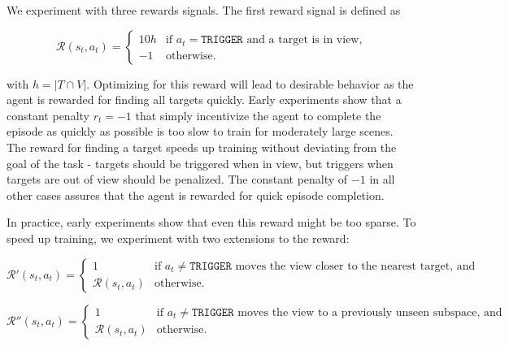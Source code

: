 
We experiment with three rewards signals.
The first reward signal is defined as

\begin{equation*}
    \mathcal{R}(s_t, a_t) =
    \begin{cases}
        10h & \text{if \(a_t = \mathtt{TRIGGER}\) and a target is in view,} \\
        -1  & \text{otherwise.}
    \end{cases}
\end{equation*}

with \(h = \left\lvert T \cap V \right\rvert\). 
Optimizing for this reward will lead to desirable behavior as the agent is rewarded for finding all targets quickly.
Early experiments show that a constant penalty \(r_t = -1\) that simply incentivize the agent to complete the episode as quickly as possible is too slow to train for moderately large scenes.
The reward for finding a target speeds up training without deviating from the goal of the task -
targets should be triggered when in view, but triggers when targets are out of view should be penalized.
The constant penalty of \(-1\) in all other cases assures that the agent is rewarded for quick episode completion.

In practice, early experiments show that even this reward might be too sparse.
To speed up training, we experiment with two extensions to the reward:

\begin{equation*}
    \mathcal{R}'(s_t, a_t) =
    \begin{cases}
        1 & \text{if \(a_t \neq \mathtt{TRIGGER}\) moves the view closer to the nearest target, and} \\
        \mathcal{R}(s_t, a_t) & \text{otherwise}.
    \end{cases}
\end{equation*}

\begin{equation*}
    \mathcal{R}''(s_t, a_t) =
    \begin{cases}
        1 & \text{if \(a_t \neq \mathtt{TRIGGER}\) moves the view to a previously unseen subspace, and} \\
        \mathcal{R}(s_t, a_t) & \text{otherwise}.
    \end{cases}
\end{equation*}

